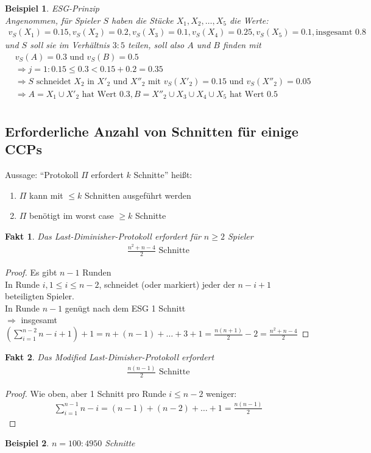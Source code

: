 \documentclass[a4paper,10pt]{scrartcl}
\newtheorem*{fakt}{Fakt}
\newtheorem*{beispiel*}{Beispiel}
\begin{document}
\begin{beispiel*}
 ESG-Prinzip\\
 Angenommen, für Spieler $S$ haben die Stücke $X_1,X_2,\dots,X_5$ die Werte:
 \begin{align*}
  v_S(X_1)=0.15, v_S(X_2)=0.2, v_S(X_3)=0.1, v_S(X_4)=0.25, v_S(X_5)=0.1, \text{insgesamt } 0.8
 \end{align*}
 und $S$ soll sie im Verhältnis $3:5$ teilen, soll also $A$ und $B$ finden mit
 \begin{eqnarray*}
  &v_S(A)=0.3\text{ und }v_S(B)=0.5\\
  &\Rightarrow j=1: 0.15\leq0.3<0.15+0.2=0.35\\
  &\Rightarrow S\text{ schneidet }X_2\text{ in }X'_2\text{ und }X''_2\text{ mit }v_S(X'_2)=0.15\text{ und }v_S(X''_2)=0.05\\
  &\Rightarrow A=X_1\cup X'_2\text{ hat Wert }0.3, B=X''_2\cup X_3\cup X_4\cup X_5\text{ hat Wert }0.5\\
 \end{eqnarray*}
\end{beispiel*}
\subsection{Erforderliche Anzahl von Schnitten für einige CCPs}
Aussage: ``Protokoll $\Pi$ erfordert $k$ Schnitte'' heißt:
\begin{enumerate}
 \item $\Pi$ kann mit $\leq k$ Schnitten ausgeführt werden
 \item $\Pi$ benötigt im worst case $\geq k$ Schnitte
\end{enumerate}
\begin{fakt}
 Das Last-Diminisher-Protokoll erfordert für $n\geq2$ Spieler
 \begin{align*}
  \frac{n^2+n-4}{2}\text{ Schnitte}
 \end{align*}
\end{fakt}
\begin{proof}
 Es gibt $n-1$ Runden\\
 In Runde $i, 1\leq i\leq n-2$, schneidet (oder markiert) jeder der $n-i+1$ beteiligten Spieler.\\
 In Runde $n-1$ genügt nach dem ESG 1 Schnitt\\
 $\Rightarrow$ insgesamt $(\sum\limits_{i=1}^{n-2}n-i+1)+1=n+(n-1)+\dots+3+1=\frac{n(n+1)}{2}-2=\frac{n^2+n-4}{2}$
\end{proof}

\begin{fakt}
 Das Modified Last-Dimisher-Protokoll erfordert
 \begin{align*}
  \frac{n(n-1)}{2}\text{ Schnitte}
 \end{align*}
\end{fakt}
\begin{proof}
 Wie oben, aber 1 Schnitt pro Runde $i\leq n-2$ weniger:
 \begin{align*}
  \sum\limits_{i=1}^{n-1}n-i=(n-1)+(n-2)+\dots+1=\frac{n(n-1)}{2}
 \end{align*}
\end{proof}
\begin{beispiel*}
 $n=100: 4950$ Schnitte
\end{beispiel*}

\end{document}
